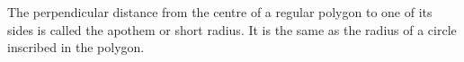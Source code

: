 The perpendicular distance from the centre of a regular polygon to one of
its sides is called the apothem or short radius. It is the same as the
radius of a circle inscribed in the polygon.